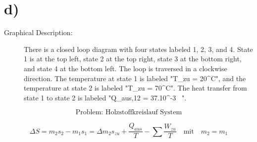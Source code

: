 

\section*{d)}
\begin{description}
    \item[Graphical Description:] 
    There is a closed loop diagram with four states labeled 1, 2, 3, and 4. State 1 is at the top left, state 2 at the top right, state 3 at the bottom right, and state 4 at the bottom left. The loop is traversed in a clockwise direction. The temperature at state 1 is labeled "T_{zu} = 20^\circ C", and the temperature at state 2 is labeled "T_{zu} = 70^\circ C". The heat transfer from state 1 to state 2 is labeled "Q_{aus,12} = 37.10^{-3} \, ".
\end{description}

\[
\text{Problem: Holzstoffkreislauf System}
\]

\[
\Delta S = m_2 s_2 - m_1 s_1 = \Delta m_2 s_{zu} + \frac{Q_{aus}}{T} - \sum \frac{W_{zu}}{T} \quad \text{mit} \quad m_2 = m_1
\]